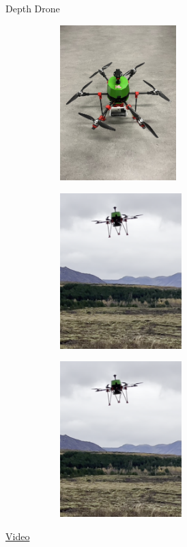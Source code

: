 \documentclass[aspectratio=169]{beamer}
\newcommand{\nologo}{\setbeamertemplate{logo}{}}
\newif\ifpause
\newcommand{\mypause}{\ifpause \pause \fi}
\begin{document}
\nologo
\begin{frame}{Depth Drone}
	\vspace{0.5cm}
	\begin{figure}[]
	    \centering
	    \begin{subfigure}[b]{0.3\linewidth}
		\includegraphics[height=6cm]{./images/depth_drone}
		\label{figure:whycode_bundle}
	    \end{subfigure}
		\mypause
		\hfill
	    \begin{subfigure}[b]{0.3\linewidth}
		\includegraphics[height=6cm]{./images/depth_drone_flying}
		\label{figure:apriltag24h10}
	    \end{subfigure}
		\mypause
		\hfill
	    \begin{subfigure}[b]{0.3\linewidth}
		\includegraphics[height=6cm]{./images/depth_drone_flying}
		\label{figure:apriltag24h10}
	    \end{subfigure}
	\end{figure}

	\vspace{-1cm}
	\href{https://photos.google.com/share/AF1QipNXTuJ1jwBbWXkfmRTWAf_jNwcutEZrpX_9k5u5lWiPdUfPsY21TfGQF_UkUXHqSA/photo/AF1QipPmBs1g8-xC1YvqdGMdKUgzxI1iednbFL9lDDPQ?key=Q1RjLVUybUlUUlB6ZlNHR1Z1WXRYTmhsb1Z2S1pR}{Video}

\end{frame}
\end{document}
